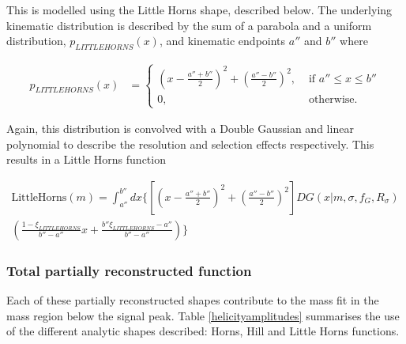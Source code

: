 This is modelled using the Little Horns shape, described below. The underlying kinematic distribution is described by the sum of a parabola and a uniform distribution, $p_{LITTLEHORNS}(x)$, and kinematic endpoints $a''$ and $b''$ where

\begin{align}
p_{LITTLEHORNS}(x) &= \begin{cases}
\left(x - \frac{a''+b''}{2}\right)^2 + \left(\frac{a''-b''}{2}\right)^2, & \text{ if $a'' \leq x \leq b''$}\\ 	
0, & \text{ otherwise.}
\end{cases} 
\end{align}

Again, this distribution is convolved with a Double Gaussian and linear polynomial to describe the resolution and selection effects respectively. This results in a Little Horns function

\begin{multline}
\text{LittleHorns}(m) = \int_{a''}^{b''} dx \biggl\{ \left[ \left( x - \frac{a''+b''}{2} \right) ^2 + \left( \frac{a''-b''}{2} \right) ^2 \right] DG(x|m,\sigma,f_G,R_{\sigma}) \\
\left( \frac{1 - \xi_{LITTLEHORNS}}{b'' - a''}x + \frac{b''\xi_{LITTLEHORNS} - a''}{b'' - a''} \right) \biggr\}
\label{eqn:littlehorns}
\end{multline}

\subsubsection{Total partially reconstructed function}

Each of these partially reconstructed shapes contribute to the mass fit in the \Bm mass region below the signal peak. Table \ref{helicityamplitudes} summarises the use of the different analytic shapes described: Horns, Hill and Little Horns functions. 

